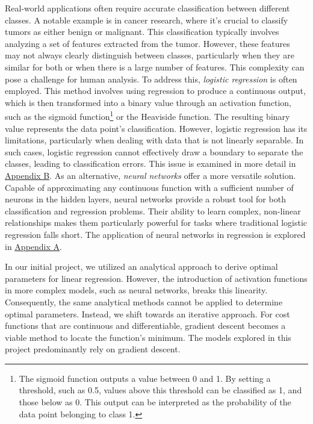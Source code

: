 \documentclass[twoside,11pt]{report}
\begin{document}
    Real-world applications often require accurate classification between different classes. 
    A notable example is in cancer research, where it's crucial to classify tumors as either benign or malignant. 
    This classification typically involves analyzing a set of features extracted from the tumor. However, these 
    features may not always clearly distinguish between classes, particularly when they are similar for both or 
    when there is a large number of features. This complexity can pose a challenge for human analysis.
    To address this, \emph{logistic regression} is often employed. This method involves using regression to produce
    a continuous output, which is then transformed into a binary value through an activation function, such 
    as the sigmoid function\footnote
    {
        The sigmoid function outputs a value between 0 and 1. By setting a threshold, such as 0.5, values 
        above this threshold can be classified as 1, and those below as 0. This output can be interpreted 
        as the probability of the data point belonging to class 1.
    }
    or the Heaviside function. The resulting binary value represents the data point's classification.
    However, logistic regression has its limitations, particularly when dealing with data that is not linearly 
    separable. In such cases, logistic regression cannot effectively draw a boundary to separate the classes, 
    leading to classification errors. This issue is examined in more detail in \hyperref[app:appendixB]{Appendix B}.
    As an alternative, \emph{neural networks} offer a more versatile solution. Capable of approximating any 
    continuous function with a sufficient number of neurons in the hidden layers\cite{HornikEtAl89}, 
    neural networks provide a robust 
    tool for both classification and regression problems. Their ability to learn complex, non-linear relationships 
    makes them particularly powerful for tasks where traditional logistic regression falls short. The application 
    of neural networks in regression is explored in \hyperref[app:appendixA]{Appendix A}.
    
    \noindent
    In our initial project\cite{MachineLearningProjects_2023}, we utilized an analytical approach to derive optimal 
    parameters for linear regression. However, the introduction of activation functions in more complex models, 
    such as neural networks, breaks this linearity. Consequently, the same analytical methods cannot be applied to 
    determine optimal parameters. Instead, we shift towards an iterative approach. For cost functions that are continuous 
    and differentiable, gradient descent becomes a viable method to locate the function's minimum. The models explored 
    in this project predominantly rely on gradient descent.
\end{document}
